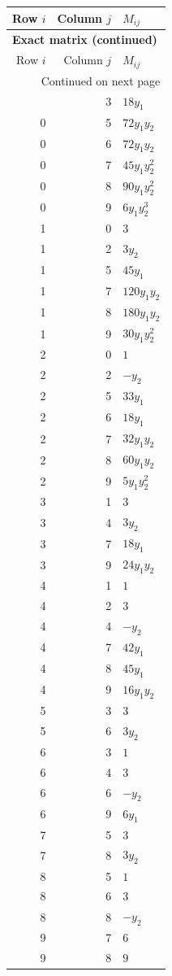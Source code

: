\documentclass[10pt,a4paper]{article}
\begin{document}
{\small\setlength{\tabcolsep}{7pt}\begin{longtable}{rrp{125mm}}
\toprule Row $i$ & Column $j$ & $M_{ij}$\\\midrule\endfirsthead
\multicolumn{3}{l}{\textbf{Exact matrix (continued)}}\\
\toprule Row $i$ & Column $j$ & $M_{ij}$\\\midrule\endhead
\midrule\multicolumn{3}{r}{Continued on next page}\\\endfoot\bottomrule\endlastfoot
0 & 3 & $18 y_{1}$\\
0 & 5 & $72 y_{1} y_{2}$\\
0 & 6 & $72 y_{1} y_{2}$\\
0 & 7 & $45 y_{1} y_{2}^{2}$\\
0 & 8 & $90 y_{1} y_{2}^{2}$\\
0 & 9 & $6 y_{1} y_{2}^{3}$\\
1 & 0 & $3$\\
1 & 2 & $3 y_{2}$\\
1 & 5 & $45 y_{1}$\\
1 & 7 & $120 y_{1} y_{2}$\\
1 & 8 & $180 y_{1} y_{2}$\\
1 & 9 & $30 y_{1} y_{2}^{2}$\\
2 & 0 & $1$\\
2 & 2 & $- y_{2}$\\
2 & 5 & $33 y_{1}$\\
2 & 6 & $18 y_{1}$\\
2 & 7 & $32 y_{1} y_{2}$\\
2 & 8 & $60 y_{1} y_{2}$\\
2 & 9 & $5 y_{1} y_{2}^{2}$\\
3 & 1 & $3$\\
3 & 4 & $3 y_{2}$\\
3 & 7 & $18 y_{1}$\\
3 & 9 & $24 y_{1} y_{2}$\\
4 & 1 & $1$\\
4 & 2 & $3$\\
4 & 4 & $- y_{2}$\\
4 & 7 & $42 y_{1}$\\
4 & 8 & $45 y_{1}$\\
4 & 9 & $16 y_{1} y_{2}$\\
5 & 3 & $3$\\
5 & 6 & $3 y_{2}$\\
6 & 3 & $1$\\
6 & 4 & $3$\\
6 & 6 & $- y_{2}$\\
6 & 9 & $6 y_{1}$\\
7 & 5 & $3$\\
7 & 8 & $3 y_{2}$\\
8 & 5 & $1$\\
8 & 6 & $3$\\
8 & 8 & $- y_{2}$\\
9 & 7 & $6$\\
9 & 8 & $9$\\
\end{longtable}}
\end{document}
